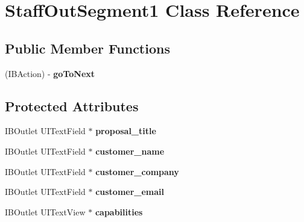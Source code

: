 \hypertarget{interface_staff_out_segment1}{
\section{\-Staff\-Out\-Segment1 \-Class \-Reference}
\label{interface_staff_out_segment1}
}
\subsection*{\-Public \-Member \-Functions}
\begin{DoxyCompactItemize}
\item 
\hypertarget{interface_staff_out_segment1_aaaedc47bbf381bb5dd3abd35a08d6157}{
(\-I\-B\-Action) -\/ {\bfseries go\-To\-Next}}
\label{interface_staff_out_segment1_aaaedc47bbf381bb5dd3abd35a08d6157}

\end{DoxyCompactItemize}
\subsection*{\-Protected \-Attributes}
\begin{DoxyCompactItemize}
\item 
\hypertarget{interface_staff_out_segment1_ac452bbe9c38e6b861e2ecbc6d315e75d}{
\-I\-B\-Outlet \-U\-I\-Text\-Field $\ast$ {\bfseries proposal\-\_\-title}}
\label{interface_staff_out_segment1_ac452bbe9c38e6b861e2ecbc6d315e75d}

\item 
\hypertarget{interface_staff_out_segment1_a29d9d7fe42e85617d9f3bb3f78d2529e}{
\-I\-B\-Outlet \-U\-I\-Text\-Field $\ast$ {\bfseries customer\-\_\-name}}
\label{interface_staff_out_segment1_a29d9d7fe42e85617d9f3bb3f78d2529e}

\item 
\hypertarget{interface_staff_out_segment1_a4b3b6b49d9f1bb33dc01c1ff9dc85d6a}{
\-I\-B\-Outlet \-U\-I\-Text\-Field $\ast$ {\bfseries customer\-\_\-company}}
\label{interface_staff_out_segment1_a4b3b6b49d9f1bb33dc01c1ff9dc85d6a}

\item 
\hypertarget{interface_staff_out_segment1_a87cc50ed4071581e66de7fead6ff2da9}{
\-I\-B\-Outlet \-U\-I\-Text\-Field $\ast$ {\bfseries customer\-\_\-email}}
\label{interface_staff_out_segment1_a87cc50ed4071581e66de7fead6ff2da9}

\item 
\hypertarget{interface_staff_out_segment1_abf8bf544a95951a8a8dbba1c6f5b1bae}{
\-I\-B\-Outlet \-U\-I\-Text\-View $\ast$ {\bfseries capabilities}}
\label{interface_staff_out_segment1_abf8bf544a95951a8a8dbba1c6f5b1bae}

\end{DoxyCompactItemize}
